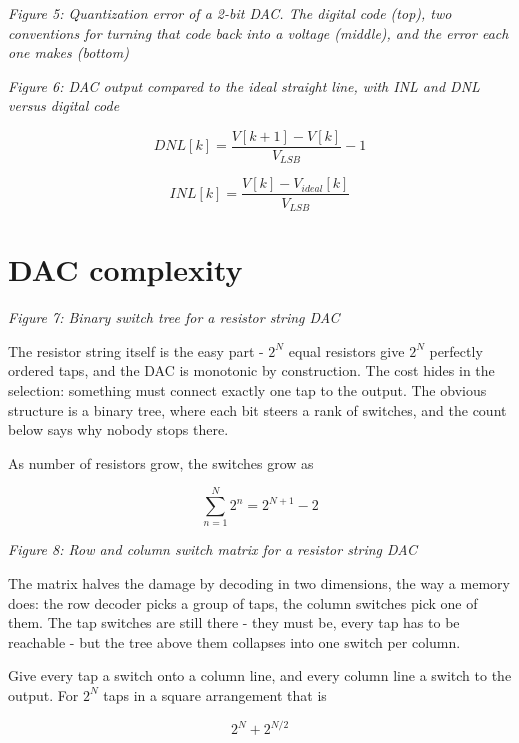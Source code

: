 {
\centering
{}
}

\emph{Figure 5: Quantization error of a 2-bit DAC. The digital code
(top), two conventions for turning that code back into a voltage
(middle), and the error each one makes (bottom)}


{
\centering
{}
}

\emph{Figure 6: DAC output compared to the ideal straight line, with INL
and DNL versus digital code}

\[ DNL[k] = \frac{V[k+1] - V[k]}{V_{LSB}} - 1 \]

\[ INL[k] = \frac{V[k] - V_{ideal}[k]}{V_{LSB}} \]

\section{DAC complexity}\label{dac-complexity}


{
\centering
{}
}

\emph{Figure 7: Binary switch tree for a resistor string DAC}

The resistor string itself is the easy part - \(2^N\) equal resistors
give \(2^N\) perfectly ordered taps, and the DAC is monotonic by
construction. The cost hides in the selection: something must connect
exactly one tap to the output. The obvious structure is a binary tree,
where each bit steers a rank of switches, and the count below says why
nobody stops there.

As number of resistors grow, the switches grow as

\[ \sum_{n=1}^{N} 2^n = 2^{N+1} - 2 \]


{
\centering
{}
}

\emph{Figure 8: Row and column switch matrix for a resistor string DAC}

The matrix halves the damage by decoding in two dimensions, the way a
memory does: the row decoder picks a group of taps, the column switches
pick one of them. The tap switches are still there - they must be, every
tap has to be reachable - but the tree above them collapses into one
switch per column.

Give every tap a switch onto a column line, and every column line a
switch to the output. For \(2^N\) taps in a square arrangement that is

\[ 2^{N} + 2^{N/2} \]


{
\centering
{}
}

